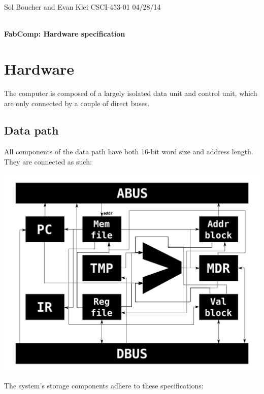\documentclass[12pt]{article}
\begin{document}
\setlength{\parindent}{0pt}

\begin{framed}
Sol Boucher and Evan Klei \hfill CSCI-453-01 \hfill 04/28/14 \\
\vspace{6pt} \\
\centerline{\textbf{\huge FabComp: Hardware specification}}
\end{framed}

\section{Hardware}
The computer is composed of a largely isolated data unit and control unit, which are only connected by a couple of direct buses.

\subsection{Data path}
All components of the data path have both 16-bit word size and address length.
They are connected as such:

\includegraphics[width=\textwidth]{datapath}

The system's storage components adhere to these specifications:
\end{document}
